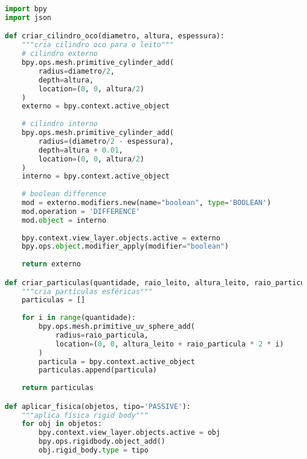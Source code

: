 \begin{lstlisting}[language=Python, caption={Trecho do script Blender para criação de leito}]
import bpy
import json

def criar_cilindro_oco(diametro, altura, espessura):
    """cria cilindro oco para o leito"""
    # cilindro externo
    bpy.ops.mesh.primitive_cylinder_add(
        radius=diametro/2,
        depth=altura,
        location=(0, 0, altura/2)
    )
    externo = bpy.context.active_object
    
    # cilindro interno
    bpy.ops.mesh.primitive_cylinder_add(
        radius=(diametro/2 - espessura),
        depth=altura + 0.01,
        location=(0, 0, altura/2)
    )
    interno = bpy.context.active_object
    
    # boolean difference
    mod = externo.modifiers.new(name="boolean", type='BOOLEAN')
    mod.operation = 'DIFFERENCE'
    mod.object = interno
    
    bpy.context.view_layer.objects.active = externo
    bpy.ops.object.modifier_apply(modifier="boolean")
    
    return externo

def criar_particulas(quantidade, raio_leito, altura_leito, raio_particula):
    """cria partículas esféricas"""
    particulas = []
    
    for i in range(quantidade):
        bpy.ops.mesh.primitive_uv_sphere_add(
            radius=raio_particula,
            location=(0, 0, altura_leito + raio_particula * 2 * i)
        )
        particula = bpy.context.active_object
        particulas.append(particula)
    
    return particulas

def aplicar_fisica(objetos, tipo='PASSIVE'):
    """aplica física rigid body"""
    for obj in objetos:
        bpy.context.view_layer.objects.active = obj
        bpy.ops.rigidbody.object_add()
        obj.rigid_body.type = tipo
\end{lstlisting}



